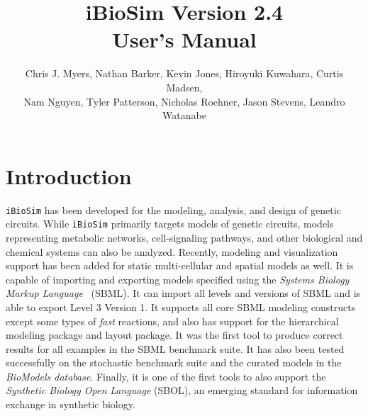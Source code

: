 \documentclass[titlepage,11pt]{article}
\title{iBioSim Version 2.4 \\ User's Manual}
\author{Chris J. Myers, Nathan Barker, Kevin Jones, Hiroyuki Kuwahara, Curtis
  Madsen, \\ Nam Nguyen, Tyler Patterson, Nicholas Roehner, Jason Stevens, Leandro Watanabe}
\begin{document}
\maketitle

  
\tableofcontents

\clearpage

\section{Introduction}

\noindent
{\tt iBioSim} has been developed for the modeling, analysis, and design of genetic circuits.  While {\tt iBioSim} primarily targets models of genetic circuits, models representing metabolic networks, cell-signaling pathways, and other biological and chemical systems can also be analyzed.  Recently, modeling and visualization support has been added for static multi-cellular and spatial models as well.
It is capable of importing and exporting models specified using the %
\emph{Systems Biology Markup Language}
~(SBML).  It can import all levels and versions of SBML and is able to export Level 3 Version 1.  It supports all core SBML modeling constructs except some types of \emph{fast} reactions, and also has support for the hierarchical modeling package and layout package.  It was the first tool to produce correct results for all examples in the SBML benchmark suite.  It has also been tested successfully on the stochastic benchmark suite and the curated models in the 
\emph{BioModels database}.
Finally, it is one of the first tools to also support the 
\emph{Synthetic Biology Open Language}
(SBOL), an emerging standard for information exchange in synthetic biology.
\end{document}
